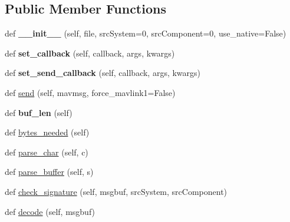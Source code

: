 \subsection*{Public Member Functions}
\begin{DoxyCompactItemize}
\item 
\mbox{\label{classpymavlink_1_1dialects_1_1v10_1_1MAVLink_abd06d6700adc0daffbaecbc022f9287a}} 
def {\bfseries \+\_\+\+\_\+init\+\_\+\+\_\+} (self, file, src\+System=0, src\+Component=0, use\+\_\+native=False)
\item 
\mbox{\label{classpymavlink_1_1dialects_1_1v10_1_1MAVLink_a23313e6bce87dc48f00eb31e8339f4a4}} 
def {\bfseries set\+\_\+callback} (self, callback, args, kwargs)
\item 
\mbox{\label{classpymavlink_1_1dialects_1_1v10_1_1MAVLink_a0a1e4c65f66c5981e64d521b50432317}} 
def {\bfseries set\+\_\+send\+\_\+callback} (self, callback, args, kwargs)
\item 
def \hyperlink{classpymavlink_1_1dialects_1_1v10_1_1MAVLink_ac0ae1945236cfbce9c1838f0b5d77057}{send} (self, mavmsg, force\+\_\+mavlink1=False)
\item 
\mbox{\label{classpymavlink_1_1dialects_1_1v10_1_1MAVLink_a6b397a74e21ba611c58726aed766cff7}} 
def {\bfseries buf\+\_\+len} (self)
\item 
def \hyperlink{classpymavlink_1_1dialects_1_1v10_1_1MAVLink_a34334ce42a9a0ae5436d693593b6a65f}{bytes\+\_\+needed} (self)
\item 
def \hyperlink{classpymavlink_1_1dialects_1_1v10_1_1MAVLink_a9de87e501ae6a392dd29d2ee14b7601c}{parse\+\_\+char} (self, c)
\item 
def \hyperlink{classpymavlink_1_1dialects_1_1v10_1_1MAVLink_a6e2d1bc42061390b83f5469190c0ca4a}{parse\+\_\+buffer} (self, s)
\item 
def \hyperlink{classpymavlink_1_1dialects_1_1v10_1_1MAVLink_a67d5d577fe7fc0a07a020f05e55703b9}{check\+\_\+signature} (self, msgbuf, src\+System, src\+Component)
\item 
def \hyperlink{classpymavlink_1_1dialects_1_1v10_1_1MAVLink_a941c79f0352a2360f14efc6e9fce9f5b}{decode} (self, msgbuf)
\item 

\end{DoxyCompactItemize}

